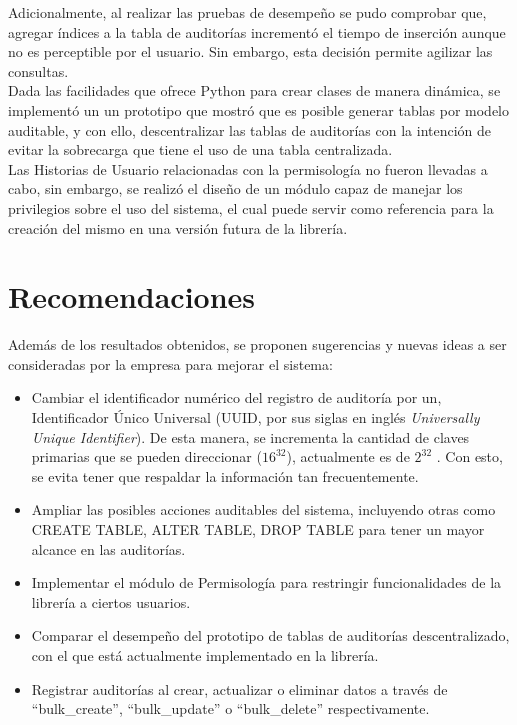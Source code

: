 Adicionalmente, al realizar las pruebas de desempeño se pudo comprobar que, agregar índices a la tabla de auditorías incrementó el tiempo de inserción aunque no es perceptible por el usuario. Sin embargo, esta decisión permite agilizar las consultas.\\

Dada las facilidades que ofrece Python para crear clases de manera dinámica, se implementó un un prototipo que mostró que es posible generar tablas por modelo auditable, y con ello, descentralizar las tablas de auditorías con la intención de evitar la sobrecarga que tiene el uso de una tabla centralizada.\\

Las Historias de Usuario relacionadas con la permisología no fueron llevadas a cabo, sin embargo, se realizó el diseño de un módulo capaz de manejar los privilegios sobre el uso del sistema, el cual puede servir como referencia para la creación del mismo en una versión futura de la librería.

\section*{Recomendaciones}

Además de los resultados obtenidos, se proponen sugerencias y nuevas ideas a ser consideradas por la empresa para mejorar el sistema:

\begin{itemize}
    \item Cambiar el identificador numérico del registro de auditoría por un, Identificador Único Universal (UUID, por sus siglas en inglés \textit{Universally Unique Identifier}). De esta manera, se incrementa la cantidad de claves primarias que se pueden direccionar ($16^{32}$), actualmente es de $2^{32}$ . Con esto, se evita tener que respaldar la información tan frecuentemente.
    \item Ampliar las posibles acciones auditables del sistema, incluyendo otras como CREATE TABLE, ALTER TABLE, DROP TABLE para tener un mayor alcance en las auditorías.
    \item Implementar el módulo de Permisología para restringir funcionalidades de la librería a ciertos usuarios.
    \item Comparar el desempeño del prototipo de tablas de auditorías descentralizado, con el que está actualmente implementado en la librería.
    \item Registrar auditorías al crear, actualizar o eliminar datos a través de “bulk\_create”, “bulk\_update” o “bulk\_delete” respectivamente.
\end{itemize}
